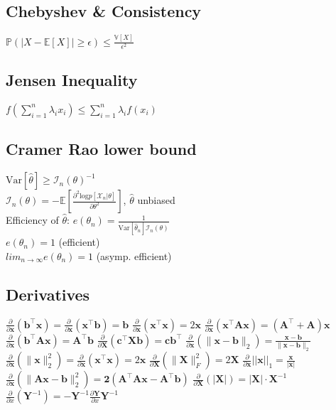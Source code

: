 \subsection*{Chebyshev \& Consistency}
$\mathbb{P}(|X-\mathbb{E}[X]|\geq \epsilon)\leq \frac{\mathbb{V}[X]}{\epsilon^2}$\\
\subsection*{Jensen Inequality}
$f(\sum_{i=1}^n \lambda_i x_i) \leq \sum_{i=1}^n \lambda_i f(x_i)$

\subsection*{Cramer Rao lower bound}
$\mathrm{Var}[\hat{\theta}]\geq \mathcal{I}_n(\theta)^{-1}$\\
$\mathcal{I}_n(\theta) = -\mathbb{E}[\frac{\partial^2 \mathrm{log}p[\mathcal{X}_n|\theta]}{\partial \theta^2}]$, $\hat{\theta}$ unbiased\\
Efficiency of $\hat{\theta}$: $e(\theta_n)=\frac{1}{\mathrm{Var}[\hat{\theta}_n]\mathcal{I}_n(\theta)}$\\
$e(\theta_n) = 1$ (efficient)\\
$lim_{n\rightarrow\infty}e(\theta_n) = 1$ (asymp. efficient)

\subsection*{Derivatives}
$\frac{\partial}{\partial \mathbf{x}}(\mathbf{b}^\top \mathbf{x}) = \frac{\partial}{\partial \mathbf{x}}(\mathbf{x}^\top \mathbf{b}) = \mathbf{b}$ \quad
$\frac{\partial}{\partial \mathbf{x}}(\mathbf{x}^\top \mathbf{x}) = 2\mathbf{x}$ \quad
$\frac{\partial}{\partial \mathbf{x}}(\mathbf{x}^\top \mathbf{A}\mathbf{x}) = (\mathbf{A}^\top + \mathbf{A})\mathbf{x}$ \quad
$\frac{\partial}{\partial \mathbf{x}}(\mathbf{b}^\top \mathbf{A}\mathbf{x}) = \mathbf{A}^\top \mathbf{b}$ \quad
$\frac{\partial}{\partial \mathbf{X}}(\mathbf{c}^\top \mathbf{X} \mathbf{b}) = \mathbf{c}\mathbf{b}^\top$ \quad
$\frac{\partial}{\partial \mathbf{x}}(\| \mathbf{x}-\mathbf{b} \|_2) = \frac{\mathbf{x}-\mathbf{b}}{\|\mathbf{x}-\mathbf{b}\|_2}$ \quad
$\frac{\partial}{\partial \mathbf{x}}(\|\mathbf{x}\|^2_2) = \frac{\partial}{\partial \mathbf{x}} (\mathbf{x}^\top \mathbf{x}) = 2\mathbf{x}$ \quad
$\frac{\partial}{\partial \mathbf{X}}(\|\mathbf{X}\|_F^2) = 2\mathbf{X}$  \quad $\frac{\partial}{\partial \mathbf{x}}||\mathbf{x}||_1 = \frac{\mathbf{x}}{|\mathbf{x}|}$ \quad
$\frac{\partial}{\partial \mathbf{x}}(\|\mathbf{Ax - b}\|_2^2) = \mathbf{2(A^\top Ax-A^\top b)}$ \quad
$\frac{\partial}{\partial \mathbf{X}}(|\mathbf{X}|) = |\mathbf{X}|\cdot \mathbf{X}^{-1}$ \quad $\frac{\partial}{\partial x}(\mathbf{Y}^{-1}) = -\mathbf{Y}^{-1} \frac{\partial\mathbf{Y}}{\partial x} \mathbf{Y}^{-1}$

